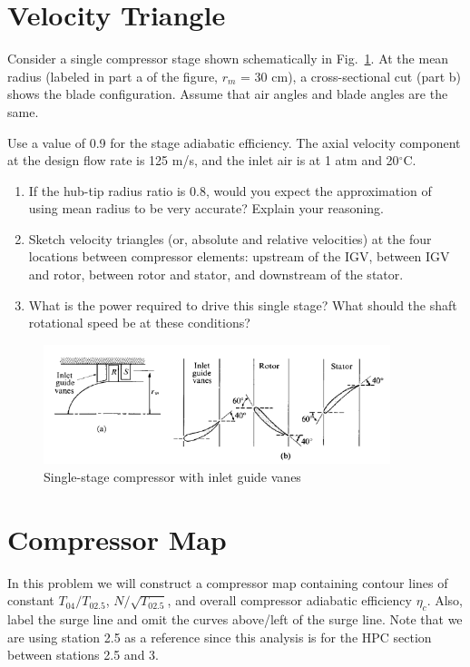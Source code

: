 \documentclass[11pt]{article}
\begin{document}
\section{Velocity Triangle}
  Consider a single compressor stage shown schematically in Fig.~\ref{FIG_SCHEMATIC}. At the mean radius (labeled in part a of the figure, $r_m$ = 30 cm), a cross-sectional cut (part b) shows the blade configuration. Assume that air angles and blade angles are the same.

  Use a value of 0.9 for the stage adiabatic efficiency. The axial velocity component at the design flow rate is 125 m/s, and the inlet air is at 1 atm and 20$^\circ$C.
  
  \begin{enumerate}[label=(\alph*)]
  	\item
    	If the hub-tip radius ratio is 0.8, would you expect the approximation of using mean radius to be very accurate?  Explain your reasoning.
    \item
    	Sketch velocity triangles (or, absolute and relative velocities) at the four locations between compressor elements: upstream of the IGV, between IGV and rotor, between rotor and stator, and downstream of the stator.
    \item
    	What is the power required to drive this single stage?  What should the shaft rotational speed be at these conditions?
  \end{enumerate}

  \begin{figure}[!ht!]
      \begin{center}
          \includegraphics[width=0.9\textwidth]{schematic.png}
          \caption{\label{FIG_SCHEMATIC} Single-stage compressor with inlet guide vanes}
      \end{center}
  \end{figure}
\section{Compressor Map}
	In this problem we will construct a compressor map containing contour lines of constant $T_{04}/T_{02.5}$, $N/\sqrt{T_{02.5}}$, and overall compressor adiabatic efficiency $\eta_c$. Also, label the surge line and omit the curves above/left of the surge line. Note that we are using station 2.5 as a reference since this analysis is for the HPC section between stations 2.5 and 3.
    
\end{document}
